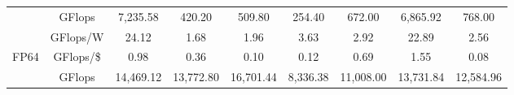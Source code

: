 \begin{table}[H]
\begin{adjustwidth}{-1.5in}{-1.5in}
\begin{center}
{\begin{tabular}{cc||c|c|c|c|c|c|c}
                                  &  GFlops                                                                                 & 7,235.58                                                        & 420.20                                                           & 509.80                                                               & 254.40                                                        & 672.00                                                               & 6,865.92                                                               & 768.00                                                                 \\
                                  & \cellcolor[HTML]{EFEFEF}GFlops/W                                                       & \cellcolor[HTML]{EFEFEF}24.12                                   & \cellcolor[HTML]{EFEFEF}1.68                                     & \cellcolor[HTML]{EFEFEF}1.96                                         & \cellcolor[HTML]{EFEFEF}3.63                                  & \cellcolor[HTML]{EFEFEF}2.92                                         & \cellcolor[HTML]{EFEFEF}22.89                                          & \cellcolor[HTML]{EFEFEF}2.56                                           \\
\multirow{-3}{*}{FP64}            & GFlops/\$                                                                              & 0.98                                                            & 0.36                                                             & 0.10                                                                 & 0.12                                                          & 0.69                                                                 & 1.55                                                                   & 0.08                                                                   \\ \hline
                                  & \cellcolor[HTML]{EFEFEF}GFlops                                                         & \cellcolor[HTML]{EFEFEF}14,469.12                               & \cellcolor[HTML]{EFEFEF}13,772.80                                & \cellcolor[HTML]{EFEFEF}16,701.44                                    & \cellcolor[HTML]{EFEFEF}8,336.38                              & \cellcolor[HTML]{EFEFEF}11,008.00                                    & \cellcolor[HTML]{EFEFEF}13,731.84                                      & \cellcolor[HTML]{EFEFEF}12,584.96                                      \\

\end{tabular}}
\end{center}
\end{adjustwidth}
\end{table}
